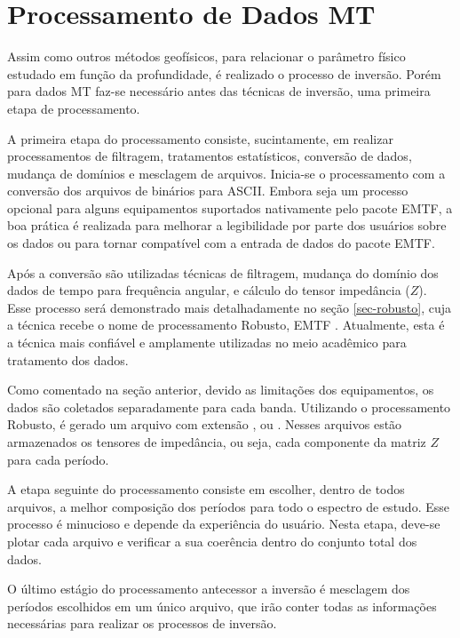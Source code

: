     \section{Processamento de Dados MT}
    
        Assim como outros métodos geofísicos, para relacionar o parâmetro físico estudado em função da profundidade, é realizado o processo de inversão. Porém para dados MT faz-se necessário antes das técnicas de inversão, uma primeira etapa de processamento.
        
        A primeira etapa do processamento consiste, sucintamente, em realizar processamentos de filtragem, tratamentos estatísticos, conversão de dados, mudança de domínios e mesclagem de arquivos. Inicia-se o processamento com a conversão dos arquivos de binários para ASCII. Embora seja um processo opcional para alguns equipamentos suportados nativamente pelo pacote EMTF, a boa prática é realizada para melhorar a legibilidade por parte dos usuários sobre os dados ou para tornar compatível com a entrada de dados do pacote EMTF.
        
        Após a conversão são utilizadas técnicas de filtragem, mudança do domínio dos dados de tempo para frequência angular, e cálculo do tensor impedância ($Z$). Esse processo será demonstrado mais detalhadamente no seção \ref{sec-robusto}, cuja a técnica recebe o nome de processamento Robusto, EMTF \cite{robusto-egbert}. Atualmente, esta é a técnica mais confiável e amplamente utilizadas no meio acadêmico para tratamento dos dados.
        
        Como comentado na seção anterior, devido as limitações dos equipamentos, os dados são coletados separadamente para cada banda. Utilizando o processamento Robusto, é gerado um arquivo com extensão ,  ou . Nesses arquivos estão armazenados os tensores de impedância, ou seja, cada componente da matriz $Z$ para cada período.
        
        A etapa seguinte do processamento consiste em escolher, dentro de todos arquivos, a melhor composição dos períodos para todo o espectro de estudo. Esse processo é minucioso e depende da experiência do usuário. Nesta etapa, deve-se plotar cada arquivo e verificar a sua coerência dentro do conjunto total dos dados.
        
        O último estágio do processamento antecessor a inversão é mesclagem dos períodos escolhidos em um único arquivo, que irão conter todas as informações necessárias para realizar os processos de inversão.
        
